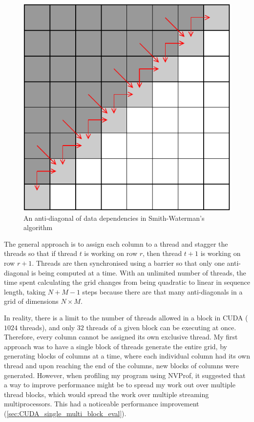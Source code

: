 \begin{figure}
  \centering
  \includegraphics[width=\textwidth/2]{figs/diagonalised_grid.pdf}
  \caption{An anti-diagonal of data dependencies in Smith-Waterman’s algorithm}
  \label{fig:Diagonalised_Grid}
\end{figure}

The general approach is to assign each column to a thread and stagger the threads so that if thread $t$ is working on row $r$, then thread $t+1$ is working on row $r+1$.
Threads are then synchronised using a barrier so that only one anti-diagonal is being computed at a time.
With an unlimited number of threads, the time spent calculating the grid changes from being quadratic to linear in sequence length, taking $N + M - 1$ steps because there are that many anti-diagonals in a grid of dimensions $N\times M$.

In reality, there is a limit to the number of threads allowed in a block in CUDA ($1024$ threads), and only $32$ threads of a given block can be executing at once.
Therefore, every column cannot be assigned its own exclusive thread.
My first approach was to have a single block of threads generate the entire grid, by generating blocks of columns at a time, where each individual column had its own thread and upon reaching the end of the columns, new blocks of columns were generated.
However, when profiling my program using NVProf, it suggested that a way to improve performance might be to spread my work out over multiple thread blocks, which would spread the work over multiple streaming multiprocessors.
This had a noticeable performance improvement (\cref{sec:CUDA_single_multi_block_eval}).

